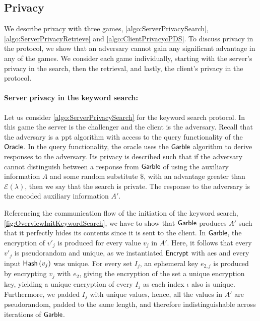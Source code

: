 \subsection*{\thesubsection\quad Privacy}\label{subsec:DiscussionPrivacy}

We describe privacy with three games, \cref{algo:ServerPrivacySearch}, \cref{algo:ServerPrivacyRetrieve} and \cref{algo:ClientPrivacycPDS}. To discuss privacy in the protocol, we show that an adversary cannot gain any significant advantage in any of the games. We consider each game individually, starting with the server's privacy in the search, then the retrieval, and lastly, the client's privacy in the protocol.

\paragraph*{Server privacy in the keyword search:} Let us consider \cref{algo:ServerPrivacySearch} for the keyword search protocol. In this game the server is the challenger and the client is the adversary. Recall that the adversary is a \acrshort{ppt} algorithm with access to the query functionality of the $ \mathsf{{Oracle}} $. In the query functionality, the oracle uses the $ \mathsf{{Garble}} $ algorithm to derive responses to the adversary. Its privacy is described such that if the adversary cannot distinguish between a response from $ \mathsf{{Garble}} $ of using the auxiliary information $ A $ and some random substitute $ \$ $, with an advantage greater than $ \mathcal{E} \left( \lambda \right) $, then we say that the search is private. The response to the adversary is the encoded auxiliary information $ A' $.

 Referencing the communication flow of the initiation of the keyword search, \cref{fig:OverviewInitKeywordSearch}, we have to show that $ \mathsf{{Garble}} $ produces $ A' $ such that it perfectly hides its contents since it is sent to the client. In $ \mathsf{{Garble}} $, the encryption of $ v'_j $ is produced for every value $ v_j $ in $ A' $. Here, it follows that every $ v'_j $ is pseudorandom and unique, as we instantiated $ \mathsf{{Encrypt}} $ with \acrshort{aes} and every input $ \mathsf{Hash}\left( v_j \right) $ was unique. For every set $ I_j $, an ephemeral key $ e_{2,j} $ is produced by encrypting $ v_j $ with $ e_2 $, giving the encryption of the set a unique encryption key, yielding a unique encryption of every $ I_j $ as each index $ \iota $ also is unique. Furthermore, we padded $ I_j $ with unique values, hence, all the values in $ A' $ are pseudorandom, padded to the same length, and therefore indistinguishable across iterations of $ \mathsf{{Garble}} $. 
 
